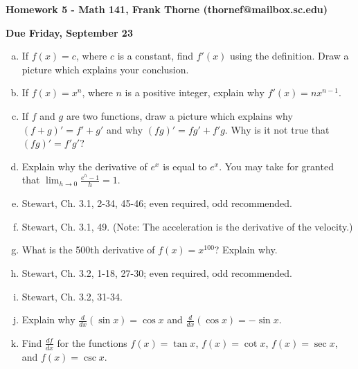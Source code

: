 \documentclass[12pt]{article}
\begin{document}
\setlength{\topmargin}{-2mm}





\begin{center}{\bf Homework 5 - Math 141, Frank Thorne (thornef@mailbox.sc.edu)}
\end{center}
\begin{center}
{\bf Due Friday, September 23}
\end{center}

\begin{enumerate}[(a)]
\item
If $f(x) = c$, where $c$ is a constant, find $f'(x)$ using the definition.
Draw a picture which explains your conclusion.

\item
If $f(x) = x^n$, where $n$ is a positive integer, explain why $f'(x) = n x^{n - 1}$.

\item
If $f$ and $g$ are two functions, draw a picture which explains why $(f + g)' = f' + g'$
and why $(fg)' = fg' + f'g$. Why is it not true that $(fg)' = f' g'$?

\item
Explain why the derivative of $e^x$ is equal to $e^x$. You may take for granted that
$\lim_{h \rightarrow 0} \frac{e^h - 1}{h} = 1$.

\item
Stewart, Ch. 3.1, 2-34, 45-46; even required, odd recommended.

\item
Stewart, Ch. 3.1, 49. (Note: The acceleration is the derivative of the velocity.)

\item
What is the 500th derivative of $f(x) = x^{100}$? Explain why.

\item
Stewart, Ch. 3.2, 1-18, 27-30; even required, odd recommended.

\item
Stewart, Ch. 3.2, 31-34.

\item
Explain why $\frac{d}{dx}(\sin x) = \cos x$ and $\frac{d}{dx}(\cos x) = - \sin x$.

\item
Find $\frac{df}{dx}$ for the functions $f(x) = \tan x$, $f(x) = \cot x$, $f(x) = \sec x$, and
$f(x) = \csc x$.


\end{enumerate}
\end{document}

